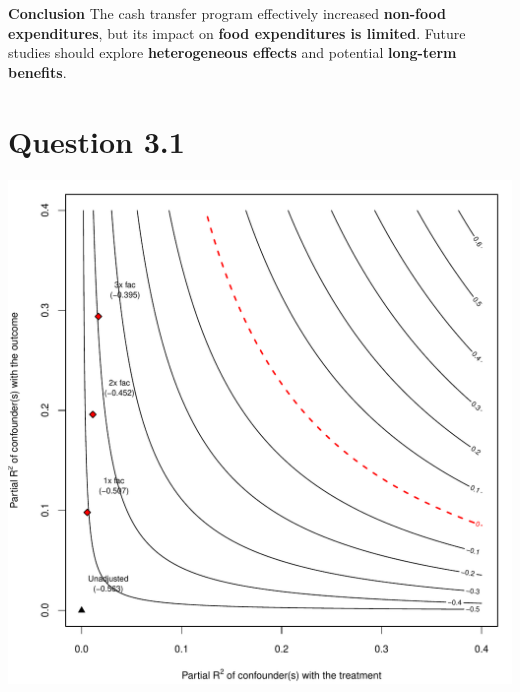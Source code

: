 \documentclass[12pt, oneside]{article}
\begin{document}
\textbf{Conclusion}
The cash transfer program effectively increased \textbf{non-food expenditures}, but its impact on \textbf{food expenditures is limited}. Future studies should explore \textbf{heterogeneous effects} and potential \textbf{long-term benefits}.

\section{Question 3.1}
\includegraphics[]{Rplots.pdf}
\end{document}
